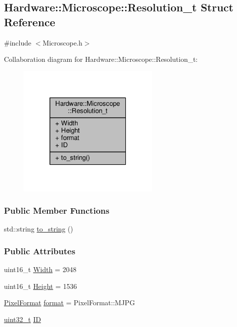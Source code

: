 \hypertarget{struct_hardware_1_1_microscope_1_1_resolution__t}{}\subsection{Hardware\+:\+:Microscope\+:\+:Resolution\+\_\+t Struct Reference}
\label{struct_hardware_1_1_microscope_1_1_resolution__t}


{\ttfamily \#include $<$Microscope.\+h$>$}



Collaboration diagram for Hardware\+:\+:Microscope\+:\+:Resolution\+\_\+t\+:
\nopagebreak
\begin{figure}[H]
\begin{center}
\leavevmode
\includegraphics[width=195pt]{struct_hardware_1_1_microscope_1_1_resolution__t__coll__graph}
\end{center}
\end{figure}
\subsubsection*{Public Member Functions}
\begin{DoxyCompactItemize}
\item 
std\+::string \hyperlink{struct_hardware_1_1_microscope_1_1_resolution__t_a7cbc6a0a1253a83e514f0c7c97aa1971}{to\+\_\+string} ()
\end{DoxyCompactItemize}
\subsubsection*{Public Attributes}
\begin{DoxyCompactItemize}
\item 
uint16\+\_\+t \hyperlink{struct_hardware_1_1_microscope_1_1_resolution__t_a806e65c6ee59267a6a1c312c61a905dd}{Width} = 2048
\item 
uint16\+\_\+t \hyperlink{struct_hardware_1_1_microscope_1_1_resolution__t_a0f56bb68dbaf77d47159e46d5384ee60}{Height} = 1536
\item 
\hyperlink{class_hardware_1_1_microscope_a1ca86e9e414d0497f2b2d88b258be1a7}{Pixel\+Format} \hyperlink{struct_hardware_1_1_microscope_1_1_resolution__t_a541b9faa798790e33aa42391d4b451b7}{format} = Pixel\+Format\+::\+M\+J\+P\+G
\item 
\hyperlink{_soil_math_types_8h_a435d1572bf3f880d55459d9805097f62}{uint32\+\_\+t} \hyperlink{struct_hardware_1_1_microscope_1_1_resolution__t_a953e7a65311a4861b6db47b4faf74d4e}{I\+D}
\end{DoxyCompactItemize}


